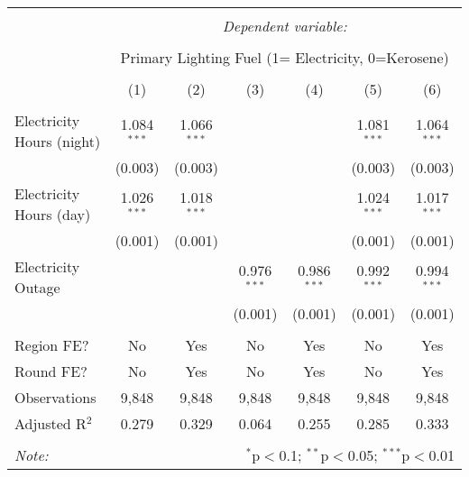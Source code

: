 

\begin{tabular}{@{\extracolsep{5pt}}lcccccc} 
\\[-1.8ex]\hline 
\hline \\[-1.8ex] 
 & \multicolumn{6}{c}{\textit{Dependent variable:}} \\ 
\cline{2-7} 
\\[-1.8ex] & \multicolumn{6}{c}{Primary Lighting Fuel (1= Electricity, 0=Kerosene)} \\ 
\\[-1.8ex] & (1) & (2) & (3) & (4) & (5) & (6)\\ 
\hline \\[-1.8ex] 
 Electricity Hours (night) & 1.084$^{***}$ & 1.066$^{***}$ &  &  & 1.081$^{***}$ & 1.064$^{***}$ \\ 
  & (0.003) & (0.003) &  &  & (0.003) & (0.003) \\ 
  Electricity Hours (day) & 1.026$^{***}$ & 1.018$^{***}$ &  &  & 1.024$^{***}$ & 1.017$^{***}$ \\ 
  & (0.001) & (0.001) &  &  & (0.001) & (0.001) \\ 
  Electricity Outage &  &  & 0.976$^{***}$ & 0.986$^{***}$ & 0.992$^{***}$ & 0.994$^{***}$ \\ 
  &  &  &(0.001)  & (0.001) & (0.001) & (0.001) \\ 
 \hline \\[-1.8ex] 
Region FE? & No & Yes & No & Yes & No & Yes \\ 
Round FE? & No & Yes & No & Yes & No & Yes \\ 
Observations & 9,848 & 9,848 & 9,848 & 9,848 & 9,848 & 9,848 \\ 
Adjusted R$^{2}$ & 0.279 & 0.329 & 0.064 & 0.255 & 0.285 & 0.333 \\ 
\hline 
\hline \\[-1.8ex] 
\textit{Note:}  & \multicolumn{6}{r}{$^{*}$p$<$0.1; $^{**}$p$<$0.05; $^{***}$p$<$0.01} \\ 
\end{tabular} 